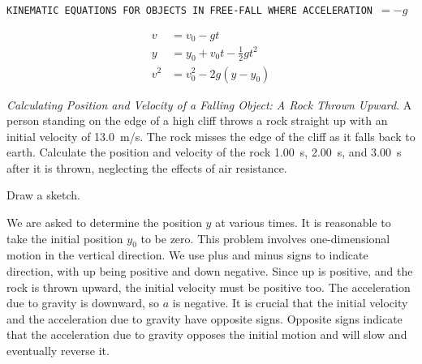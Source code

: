 \documentclass[main-ap-physics.tex]{subfiles}
\begin{document}
\vspace{1em}

\cyanhrule

\begin{center}
    \texttt{KINEMATIC EQUATIONS FOR OBJECTS IN FREE-FALL WHERE ACCELERATION $= -g$}
\end{center}

\vspace{-1em}

\begin{align}
    v &= v_0 - gt \label{HyF2SE} \\[1ex]
    y &= y_0 + v_0 t - \frac{1}{2} g t^2 \label{aobjvO} \\[1ex]
    v^2 &= v_0^2 - 2 g \left(y - y_0\right) \label{rYOesE}
\end{align}

\cyanhrule

\begin{example} \label{zPUpxb}
    \textit{Calculating Position and Velocity of a Falling Object: A Rock Thrown Upward}. A person standing on the edge of a high cliff throws a rock straight up with an initial velocity of \SI{13.0}{m/s}. The rock misses the edge of the cliff as it falls back to earth. Calculate the position and velocity of the rock \SI{1.00}{s}, \SI{2.00}{s}, and \SI{3.00}{s} after it is thrown, neglecting the effects of air resistance.
\end{example}

\Solution Draw a sketch.

\begin{center}
\end{center}

We are asked to determine the position $y$ at various times. It is reasonable to take the initial position $y_0$ to be zero. This problem involves one-dimensional motion in the vertical direction. We use plus and minus signs to indicate direction, with up being positive and down negative. Since up is positive, and the rock is thrown upward, the initial velocity must be positive too. The acceleration due to gravity is downward, so $a$ is negative. It is crucial that the initial velocity and the acceleration due to gravity have opposite signs. Opposite signs indicate that the acceleration due to gravity opposes the initial motion and will slow and eventually reverse it.
\end{document}
